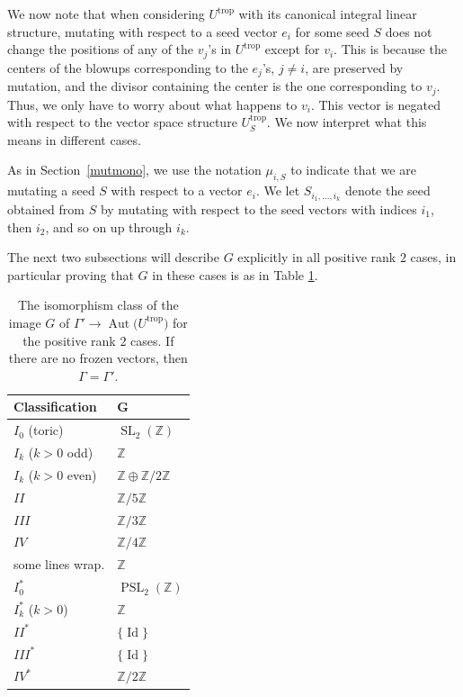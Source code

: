 \documentclass[10pt,a4paper]{amsart}
\numberwithin{equation}{section}
\numberwithin{figure}{section}
\numberwithin{table}{section}
\DeclareMathOperator{\Id}{Id}
\DeclareMathOperator{\SL}{SL}
\DeclareMathOperator{\PSL}{PSL}
\DeclareMathOperator{\trop}{trop}
\DeclareMathOperator{\Aut}{Aut}
\let\bb=\mathbb
\let\rar=\rightarrow
\theoremstyle{definition}
\begin{document}
We now note that when considering $U^{\trop}$ with its canonical integral linear structure, mutating with respect to a seed vector $e_i$ for some seed $S$ does not change the positions of any of the $v_j$'s in $U^{\trop}$ except for $v_i$. This is because the centers of the blowups corresponding to the $e_j$'s, $j\neq i$, are preserved by mutation, and the divisor containing the center is the one corresponding to $v_j$. Thus, we only have to worry about what happens to $v_i$. This vector is negated with respect to the vector space structure $U^{\trop}_S$. We now interpret what this means in different cases.

As in Section~\ref{mutmono}, we use the notation $\mu_{i,S}$ to indicate that we are mutating a seed $S$ with respect to a vector $e_i$. We let $S_{i_1,\dots,i_k}$ denote the seed obtained from $S$ by mutating with respect to the seed vectors with indices $i_1$, then $i_2$, and so on up through $i_k$.

The next two subsections will describe $G$ explicitly in all positive rank $2$ cases, in particular proving that $G$ in these cases is as in Table \ref{ClusterModularTable}.

\begin{table}[t] \centering
 \begin{tabular}{ | l | l |}
 \hline
 Classification & G 	 \\ \hline
 $I_0$ (toric) & $\SL_2(\bb{Z})$ \\ \hline
 $I_k$ ($k>0$ odd) & $\bb{Z}$ \\ \hline
 $I_k$ ($k>0$ even) & $\bb{Z}\oplus \bb{Z}/2\bb{Z}$ \\ \hline
 $II$ & $\bb{Z}/5\bb{Z}$ \\ \hline
 $III$ & $\bb{Z}/3\bb{Z}$ \\ \hline
 $IV$ & $\bb{Z}/4\bb{Z}$ \\ \hline
 some lines wrap. & $\bb{Z}$ \\ \hline
 $I^*_0$ & $\PSL_2(\bb{Z})$ \\ \hline
 $I^*_k$ ($k>0$) & $\bb{Z}$ \\ \hline
 $II^*$ & $\{\Id\}$ \\ \hline
 $III^*$ & $\{\Id\}$ \\ \hline
 $IV^*$ & $\bb{Z}/2\bb{Z}$ \\ \hline
 \end{tabular}\caption{The isomorphism class of the image $G$ of $\Gamma'\rar \Aut\big(U^{\trop}\big)$ for the positive rank $2$ cases.
 If there are no frozen vectors, then $\Gamma=\Gamma'$.}\label{ClusterModularTable}
 \end{table}
\end{document}
